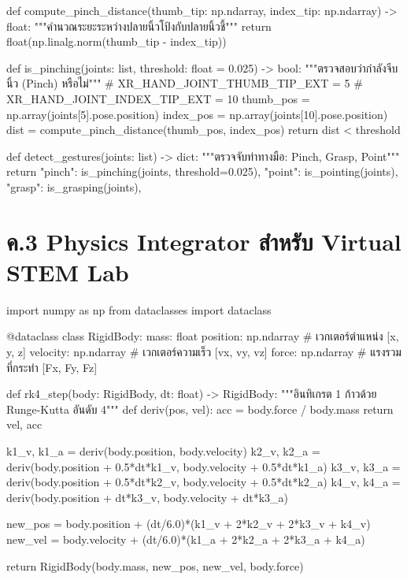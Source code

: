 \begin{codebox}
def compute_pinch_distance(thumb_tip: np.ndarray, 
                            index_tip: np.ndarray) -> float:
    """คำนวณระยะระหว่างปลายนิ้วโป้งกับปลายนิ้วชี้"""
    return float(np.linalg.norm(thumb_tip - index_tip))

def is_pinching(joints: list, threshold: float = 0.025) -> bool:
    """ตรวจสอบว่ากำลังจีบนิ้ว (Pinch) หรือไม่"""
    # XR_HAND_JOINT_THUMB_TIP_EXT = 5
    # XR_HAND_JOINT_INDEX_TIP_EXT = 10
    thumb_pos = np.array(joints[5].pose.position)
    index_pos = np.array(joints[10].pose.position)
    dist = compute_pinch_distance(thumb_pos, index_pos)
    return dist < threshold

def detect_gestures(joints: list) -> dict:
    """ตรวจจับท่าทางมือ: Pinch, Grasp, Point"""
    return {
        "pinch": is_pinching(joints, threshold=0.025),
        "point": is_pointing(joints),
        "grasp": is_grasping(joints),
    }
\end{codebox}

\section*{ค.3 Physics Integrator สำหรับ Virtual STEM Lab}

\begin{codebox}
import numpy as np
from dataclasses import dataclass

@dataclass
class RigidBody:
    mass: float
    position: np.ndarray   # เวกเตอร์ตำแหน่ง [x, y, z]
    velocity: np.ndarray   # เวกเตอร์ความเร็ว [vx, vy, vz]
    force: np.ndarray      # แรงรวมที่กระทำ [Fx, Fy, Fz]

def rk4_step(body: RigidBody, dt: float) -> RigidBody:
    """อินทิเกรต 1 ก้าวด้วย Runge-Kutta อันดับ 4"""
    def deriv(pos, vel):
        acc = body.force / body.mass
        return vel, acc
    
    k1_v, k1_a = deriv(body.position, body.velocity)
    k2_v, k2_a = deriv(body.position + 0.5*dt*k1_v, body.velocity + 0.5*dt*k1_a)
    k3_v, k3_a = deriv(body.position + 0.5*dt*k2_v, body.velocity + 0.5*dt*k2_a)
    k4_v, k4_a = deriv(body.position + dt*k3_v, body.velocity + dt*k3_a)
    
    new_pos = body.position + (dt/6.0)*(k1_v + 2*k2_v + 2*k3_v + k4_v)
    new_vel = body.velocity + (dt/6.0)*(k1_a + 2*k2_a + 2*k3_a + k4_a)
    
    return RigidBody(body.mass, new_pos, new_vel, body.force)
\end{codebox}
